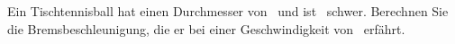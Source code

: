 Ein Tischtennisball hat einen Durchmesser von \dTTO\ und ist \mTTO\ schwer. Berechnen Sie die Bremsbeschleunigung, die er bei einer Geschwindigkeit von \vTTO\ erfährt.
